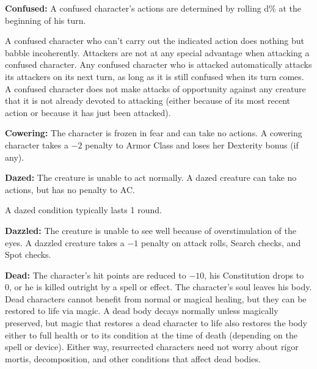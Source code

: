 \textbf{Confused:} A confused character's actions are determined by rolling d\% at the beginning of his turn.


A confused character who can't carry out the indicated action does nothing but babble incoherently. Attackers are not at any special advantage when attacking a confused character. Any confused character who is attacked automatically attacks its attackers on its next turn, as long as it is still confused when its turn comes. A confused character does not make attacks of opportunity against any creature that it is not already devoted to attacking (either because of its most recent action or because it has just been attacked).

\textbf{Cowering:} The character is frozen in fear and can take no actions. A cowering character takes a $-2$ penalty to Armor Class and loses her Dexterity bonus (if any).

\textbf{Dazed:} The creature is unable to act normally. A dazed creature can take no actions, but has no penalty to AC.

A dazed condition typically lasts 1 round.

\textbf{Dazzled:} The creature is unable to see well because of overstimulation of the eyes. A dazzled creature takes a $-1$ penalty on attack rolls, Search checks, and Spot checks.

\textbf{Dead:} The character's hit points are reduced to $-10$, his Constitution drops to 0, or he is killed outright by a spell or effect. The character's soul leaves his body. Dead characters cannot benefit from normal or magical healing, but they can be restored to life via magic. A dead body decays normally unless magically preserved, but magic that restores a dead character to life also restores the body either to full health or to its condition at the time of death (depending on the spell or device). Either way, resurrected characters need not worry about rigor mortis, decomposition, and other conditions that affect dead bodies.

